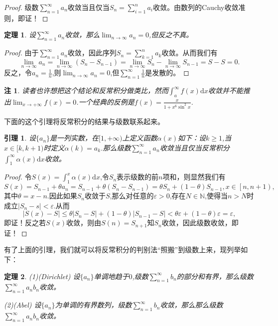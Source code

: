 \documentclass{article}
\newtheorem{theorem}{定理}[subsection]
\newtheorem{note}{注}[subsection]
\newtheorem{lemma}{引理}[subsection]
\begin{document}
\begin{proof}
级数$\sum_{n=1}^\infty a_n$收敛当且仅当$S_n=\sum_{i=1}^na_i$收敛。由数列的Cauchy收敛准则，即证！
\end{proof}
\begin{theorem}
设$\sum_{n=1}^\infty a_n$收敛，那么$\lim_{n\to\infty}a_n=0$,但反之不真。
\end{theorem}
\begin{proof}
由于$\sum_{n=1}^\infty a_n$收敛，因此序列$S_n=\sum_{k=1}^na_k$收敛。从而我们有
$$
\lim_{n\rightarrow \infty} a_n=\lim_{n\rightarrow \infty} \left( S_n-S_{n-1} \right) =\lim_{n\rightarrow \infty} S_n-\lim_{n\rightarrow \infty} S_{n-1}=S-S=0.
$$
反之，令$a_n=\frac{1}{n}$,则$\lim_{n\to\infty}a_n=0$,但$\sum_{n=1}^\infty\frac{1}{n}$是发散的。
\end{proof}
\begin{note}
读者也许想把这个结论和反常积分做类比，然而$\int_a^\infty f(x)\mathrm{d}x$收敛并不能推出$\lim_{x\to+\infty}f(x)=0$.一个经典的反例是$f\left( x \right) =\frac{x}{1+x^6\sin ^2x}$.
\end{note}
下面的这个引理将反常积分的结果与级数联系起来。
\begin{lemma}
设$\{a_n\}$是一列实数，在$[1,+\infty)$上定义函数$\alpha(x)$如下：设$k\ge 1$,当$x\in[k,k+1)$时定义$\alpha(k)=a_k$.那么级数$\sum_{n=1}^\infty a_n$收敛当且仅当反常积分$\int_1^\infty\alpha(x)\mathrm{d}x$收敛。
\end{lemma}
\begin{proof}
令$S(x)=\int_1^x\alpha(x)\mathrm{d}x$,令$S_n$表示级数的前$n$项和，则显然我们有
$$
S\left( x \right) =S_{n-1}+\theta a_n=S_{n-1}+\theta \left( S_n-S_{n-1} \right) =\theta S_n+\left( 1-\theta \right) S_{n-1},x\in \left[ n,n+1 \right) ,
$$
其中$\theta=x-n$.因此如果$S_n$收敛于$S$,那么对任意的$\varepsilon>0$,存在$N\in\mathbb{N}$,使得当$n>N$时成立$|S_n-s|<\varepsilon$.从而
$$
\left| S\left( x \right) -S \right|\le \theta \left| S_n-S \right|+\left( 1-\theta \right) \left| S_{n-1}-S \right|<\theta \varepsilon +\left( 1-\theta \right) \varepsilon =\varepsilon ,
$$
即证！反之若$S(x)$收敛，则由$S(n)=S_{n+1}$知$S_n$收敛，因此级数收敛，即证！
\end{proof}
有了上面的引理，我们就可以将反常积分的判别法“照搬”到级数上来，现列举如下：
\begin{theorem}
(1)(Dirichlet) 设$\{a_n\}$单调地趋于$0$,级数$\sum_{n=1}^\infty b_n$的部分和有界，那么级数$\sum_{n=1}^\infty a_nb_n$收敛。\par
(2)(Abel) 设$\{a_n\}$为单调的有界数列，级数$\sum_{n=1}^\infty b_n$收敛，那么那么级数$\sum_{n=1}^\infty a_nb_n$收敛。
\end{theorem}
\end{document}
